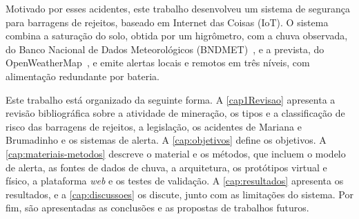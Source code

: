 Motivado por esses acidentes, este trabalho desenvolveu um sistema de
segurança para barragens de rejeitos, baseado em Internet das Coisas
(IoT). O sistema combina a saturação do solo, obtida por um higrômetro,
com a chuva observada, do Banco Nacional de Dados Meteorológicos (BNDMET)~\cite{decea_bndmet}, e a prevista, do
OpenWeatherMap~\cite{openweathermap_forecast5}, e emite alertas locais
e remotos em três níveis, com alimentação redundante por bateria.

Este trabalho está organizado da seguinte forma. A \autoref{cap1Revisao}
apresenta a revisão bibliográfica sobre a atividade de mineração, os tipos e a
classificação de risco das barragens de rejeitos, a legislação, os
acidentes de Mariana e Brumadinho e os sistemas de alerta. A
\autoref{cap:objetivos} define os objetivos. A \autoref{cap:materiais-metodos}
descreve o material e os métodos, que incluem o modelo de alerta, as fontes de dados
de chuva, a arquitetura, os protótipos virtual e físico, a plataforma
\textit{web} e os testes de validação. A \autoref{cap:resultados}
apresenta os resultados, e a \autoref{cap:discussoes} os discute, junto
com as limitações do sistema. Por fim, são apresentadas as conclusões e
as propostas de trabalhos futuros.


\vspace{10mm} %
